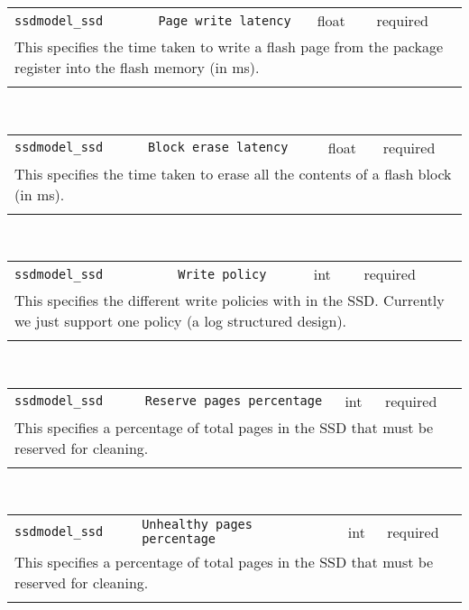 \noindent 
\begin{tabular}{|p{\lpmodwidth}|p{\lpnamewidth}|p{0.5in}|p{0.5in}|}
\cline{1-4}
\texttt{ssdmodel\_ssd} & \texttt{Page write latency} & float & required \\ 
\cline{1-4}
\multicolumn{4}{|p{6in}|}{
This specifies the time taken to write a flash page from the package
register into the flash memory (in ms).
}\\ 
\cline{1-4}
\multicolumn{4}{p{5in}}{}\\
\end{tabular}\\ 
\noindent 
\begin{tabular}{|p{\lpmodwidth}|p{\lpnamewidth}|p{0.5in}|p{0.5in}|}
\cline{1-4}
\texttt{ssdmodel\_ssd} & \texttt{Block erase latency} & float & required \\ 
\cline{1-4}
\multicolumn{4}{|p{6in}|}{
This specifies the time taken to erase all the contents of a flash
block (in ms).
}\\ 
\cline{1-4}
\multicolumn{4}{p{5in}}{}\\
\end{tabular}\\ 
\noindent 
\begin{tabular}{|p{\lpmodwidth}|p{\lpnamewidth}|p{0.5in}|p{0.5in}|}
\cline{1-4}
\texttt{ssdmodel\_ssd} & \texttt{Write policy} & int & required \\ 
\cline{1-4}
\multicolumn{4}{|p{6in}|}{
This specifies the different write policies with in the SSD. Currently
we just support one policy (a log structured design).
}\\ 
\cline{1-4}
\multicolumn{4}{p{5in}}{}\\
\end{tabular}\\ 
\noindent 
\begin{tabular}{|p{\lpmodwidth}|p{\lpnamewidth}|p{0.5in}|p{0.5in}|}
\cline{1-4}
\texttt{ssdmodel\_ssd} & \texttt{Reserve pages percentage} & int & required \\ 
\cline{1-4}
\multicolumn{4}{|p{6in}|}{
This specifies a percentage of total pages in the SSD that must be
reserved for cleaning.
}\\ 
\cline{1-4}
\multicolumn{4}{p{5in}}{}\\
\end{tabular}\\ 
\noindent 
\begin{tabular}{|p{\lpmodwidth}|p{\lpnamewidth}|p{0.5in}|p{0.5in}|}
\cline{1-4}
\texttt{ssdmodel\_ssd} & \texttt{Unhealthy pages percentage} & int & required \\ 
\cline{1-4}
\multicolumn{4}{|p{6in}|}{
This specifies a percentage of total pages in the SSD that must be
reserved for cleaning.
}\\ 
\cline{1-4}
\multicolumn{4}{p{5in}}{}\\
\end{tabular}\\ 
